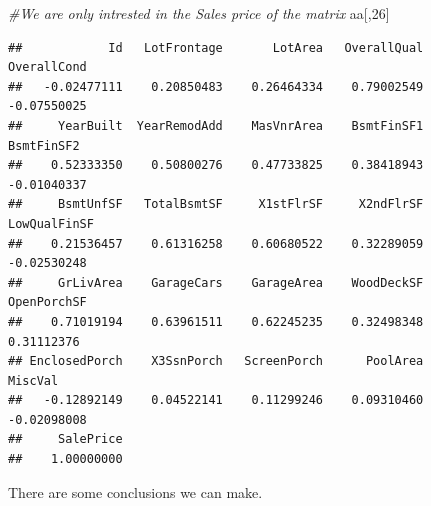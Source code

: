 \documentclass[]{article}
\newenvironment{Shaded}{\begin{snugshade}}{\end{snugshade}}
\newcommand{\DecValTok}[1]{\textcolor[rgb]{0.00,0.00,0.81}{#1}}
\newcommand{\CommentTok}[1]{\textcolor[rgb]{0.56,0.35,0.01}{\textit{#1}}}
\newcommand{\NormalTok}[1]{#1}
\begin{document}
\begin{Shaded}
\begin{Highlighting}[]
\CommentTok{#We are only intrested in the Sales price of the matrix}
\NormalTok{aa[,}\DecValTok{26}\NormalTok{]}
\end{Highlighting}
\end{Shaded}

\begin{verbatim}
##            Id   LotFrontage       LotArea   OverallQual   OverallCond 
##   -0.02477111    0.20850483    0.26464334    0.79002549   -0.07550025 
##     YearBuilt  YearRemodAdd    MasVnrArea    BsmtFinSF1    BsmtFinSF2 
##    0.52333350    0.50800276    0.47733825    0.38418943   -0.01040337 
##     BsmtUnfSF   TotalBsmtSF     X1stFlrSF     X2ndFlrSF  LowQualFinSF 
##    0.21536457    0.61316258    0.60680522    0.32289059   -0.02530248 
##     GrLivArea    GarageCars    GarageArea    WoodDeckSF   OpenPorchSF 
##    0.71019194    0.63961511    0.62245235    0.32498348    0.31112376 
## EnclosedPorch    X3SsnPorch   ScreenPorch      PoolArea       MiscVal 
##   -0.12892149    0.04522141    0.11299246    0.09310460   -0.02098008 
##     SalePrice 
##    1.00000000
\end{verbatim}

There are some conclusions we can make.
\end{document}
